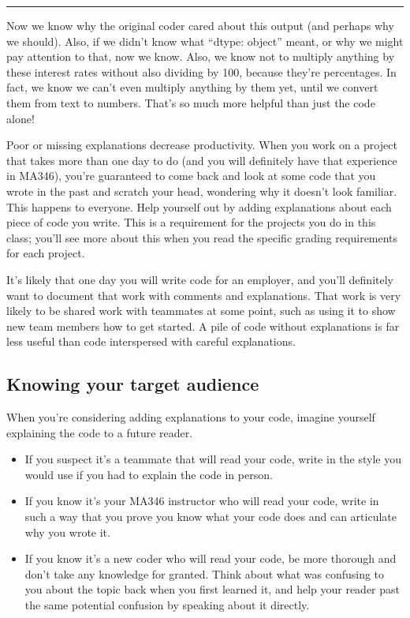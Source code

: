 \documentclass[letterpaper,10pt,english]{jupyterBook}
\begin{document}
\bigskip\hrule\bigskip


\sphinxAtStartPar
Now we know why the original coder cared about this output (and perhaps why we should).  Also, if we didn’t know what “dtype: object” meant, or why we might pay attention to that, now we know.  Also, we know not to multiply anything by these interest rates without also dividing by 100, because they’re percentages.  In fact, we know we can’t even multiply anything by them yet, until we convert them from text to numbers.  That’s so much more helpful than just the code alone!

\sphinxAtStartPar
Poor or missing explanations decrease productivity.  When you work on a project that takes more than one day to do (and you will definitely have that experience in MA346), you’re guaranteed to come back and look at some code that you wrote in the past and scratch your head, wondering why it doesn’t look familiar.  This happens to everyone.  Help yourself out by adding explanations about each piece of code you write.  This is a requirement for the projects you do in this class; you’ll see more about this when you read the specific grading requirements for each project.

\sphinxAtStartPar
It’s likely that one day you will write code for an employer, and you’ll definitely want to document that work with comments and explanations.  That work is very likely to be shared work with teammates at some point, such as using it to show new team members how to get started.  A pile of code without explanations is far less useful than code interspersed with careful explanations.


\subsection{Knowing your target audience}
\label{\detokenize{chapter-5-before-and-after:knowing-your-target-audience}}
\sphinxAtStartPar
When you’re considering adding explanations to your code, imagine yourself explaining the code to a future reader.
\begin{itemize}
\item {} 
\sphinxAtStartPar
If you suspect it’s a teammate that will read your code, write in the style you would use if you had to explain the code in person.

\item {} 
\sphinxAtStartPar
If you know it’s your MA346 instructor who will read your code, write in such a way that you prove you know what your code does and can articulate why you wrote it.

\item {} 
\sphinxAtStartPar
If you know it’s a new coder who will read your code, be more thorough and don’t take any knowledge for granted.  Think about what was confusing to you about the topic back when you first learned it, and help your reader past the same potential confusion by speaking about it directly.

\end{itemize}
\end{document}
